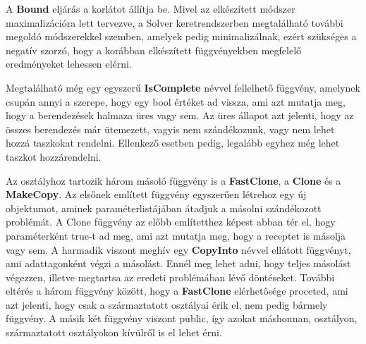 A \textbf{Bound} eljárás a korlátot állítja be.
Mivel az elkészített módszer maximalizációra lett tervezve, a Solver keretrendszerben megtalálható további megoldó módszerekkel szemben, amelyek pedig minimalizálnak, ezért szükséges a negatív szorzó, hogy a korábban elkészített függvényekben megfelelő eredményeket lehessen elérni.

Megtalálható még egy egyszerű \textbf{IsComplete} névvel fellelhető függvény, amelynek csupán annyi a szerepe, hogy egy bool értéket ad vissza, ami azt mutatja meg, hogy a berendezések halmaza üres vagy sem.
Az üres állapot azt jelenti, hogy az összes berendezés már ütemezett, vagyis nem szándékozunk, vagy nem lehet hozzá taszkokat rendelni. Ellenkező esetben pedig, legalább egyhez még lehet taszkot hozzárendelni.

Az osztályhoz tartozik három másoló függvény is a \textbf{FastClone}, a \textbf{Clone} és a \textbf{MakeCopy}.
Az elsőnek említett függvény egyszerűen létrehoz egy új objektumot, aminek paraméterlistájában átadjuk a másolni szándékozott problémát.
A Clone függvény az előbb említetthez képest abban tér el, hogy paraméterként true-t ad meg, ami azt mutatja meg, hogy a receptet is másolja vagy sem.
A harmadik viszont meghív egy \textbf{CopyInto} névvel ellátott függvényt, ami adattagonként végzi a másolást.
Ennél meg lehet adni, hogy teljes másolást végezzen, illetve megtartsa az eredeti problémában lévő döntéseket.
További eltérés a három függvény között, hogy a \textbf{FastClone} elérhetősége proceted, ami azt jelenti, hogy csak a származtatott osztályai érik el, nem pedig bármely függvény.
A másik két függvény viszont public, így azokat máshonnan, osztályon, származtatott osztályokon kívülről is el lehet érni.

